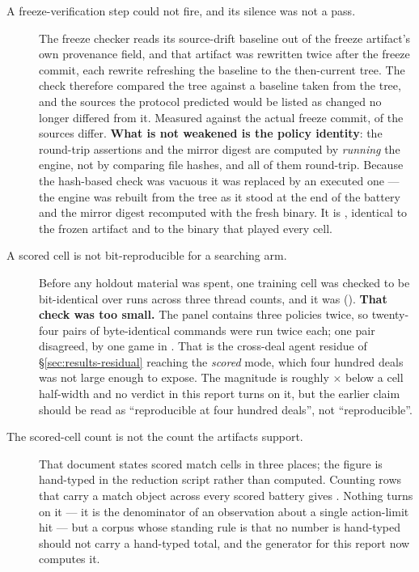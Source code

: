 \begin{description}

\item[A freeze-verification step could not fire, and its silence was not a pass.] The freeze checker reads its source-drift baseline out of the freeze artifact's own
  provenance field, and that artifact was rewritten twice after the freeze commit, each rewrite
  refreshing the baseline to the then-current tree. The check therefore compared the tree against a
  baseline taken from the tree, and the sources the protocol predicted would be listed as changed no
  longer differed from it. Measured against the actual freeze commit, \vsevenDriftChanged{} of the
  \vsevenDriftTotal{} sources differ. \textbf{What is not weakened is the policy identity}: the round-trip assertions and the
  mirror digest are computed by \emph{running} the engine, not by comparing file hashes, and all of
  them round-trip. Because the hash-based check was vacuous it was replaced by an executed one --- the
  engine was rebuilt from the tree as it stood at the end of the battery and the mirror digest
  recomputed with the fresh binary. It is \texttt{\vsevenMirrorDigest{}}, identical to the frozen
  artifact and to the binary that played every cell.

\item[A scored cell is not bit-reproducible for a searching arm.]
  \label{sec:corrections-reproducibility}
  Before any holdout material was spent, one training cell was checked to be bit-identical over
  \vsevenReproRuns{} runs across three thread counts, and it was
  (\vsevenReproIdentical{}). \textbf{That check was too small.} The panel contains three policies
  twice, so twenty-four pairs of byte-identical commands were run twice each; one pair disagreed, by
  one game in \vsevenResidueGames{}. That is the cross-deal agent residue of \S\ref{sec:results-residual}
  reaching the \emph{scored} mode, which four hundred deals was not large enough to expose. The
  magnitude is roughly \vsevenResidueRatio$\times$ below a cell half-width and no verdict in this report turns on
  it, but the earlier claim should be read as ``reproducible at four hundred deals'', not
  ``reproducible''.

\item[The scored-cell count is not the count the artifacts support.]
  That document states \vsevenScoredCellsRecorded{} scored match cells in three places; the figure is
  hand-typed in the reduction script rather than computed. Counting rows that carry a match object
  across every scored battery gives \textbf{\vsevenScoredCells{}}. Nothing turns on it --- it is the
  denominator of an observation about a single action-limit hit --- but a corpus whose standing rule is
  that no number is hand-typed should not carry a hand-typed total, and the generator for this report
  now computes it.


\end{description}
